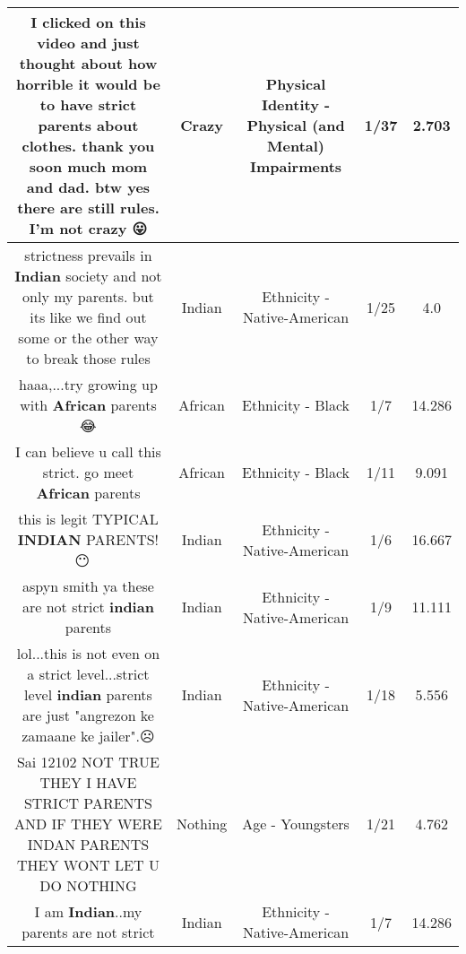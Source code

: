 \documentclass[11pt]{article}
\newlength\mylength
\begin{document}
\begin{center}
\begin{longtable}{|C{.65\mylength}|C{.30\mylength}|C{.12\mylength}|C{.12\mylength}|C{.12\mylength}|}
  \small I clicked on this video and just thought about how horrible it would be to have strict parents about clothes. thank you soon much mom and dad. btw yes there are still rules. I'm not \textbf{crazy} 😛\normalsize   & Crazy & Physical Identity - Physical (and Mental) Impairments & 1/37 & 2.703 \\  \hline
  \small strictness prevails in \textbf{Indian} society and not only my parents. but its like we find out some or the other way to break those rules\normalsize   & Indian & Ethnicity - Native-American & 1/25 & 4.0 \\  \hline
  \small haaa,...try growing up with \textbf{African} parents 😂\normalsize   & African & Ethnicity - Black & 1/7 & 14.286 \\  \hline
  \small I can believe u call this strict. go meet \textbf{African} parents\normalsize   & African & Ethnicity - Black & 1/11 & 9.091 \\  \hline
  \small this is legit TYPICAL \textbf{INDIAN} PARENTS!😶🔫🙌🤔\normalsize   & Indian & Ethnicity - Native-American & 1/6 & 16.667 \\  \hline
  \small aspyn smith ya these are not strict \textbf{indian} parents\normalsize   & Indian & Ethnicity - Native-American & 1/9 & 11.111 \\  \hline
  \small lol...this is not even on a strict level...strict level \textbf{indian} parents are just "angrezon ke zamaane ke jailer".☹\normalsize   & Indian & Ethnicity - Native-American & 1/18 & 5.556 \\  \hline
  \small Sai 12102 NOT TRUE THEY I HAVE STRICT PARENTS AND IF THEY WERE INDAN PARENTS THEY WONT LET U DO NOTHING\normalsize   & Nothing & Age - Youngsters & 1/21 & 4.762 \\  \hline
  \small I am \textbf{Indian}..my parents are not strict\normalsize   & Indian & Ethnicity - Native-American & 1/7 & 14.286 \\  \hline

\end{longtable}
\end{center}
\end{document}
